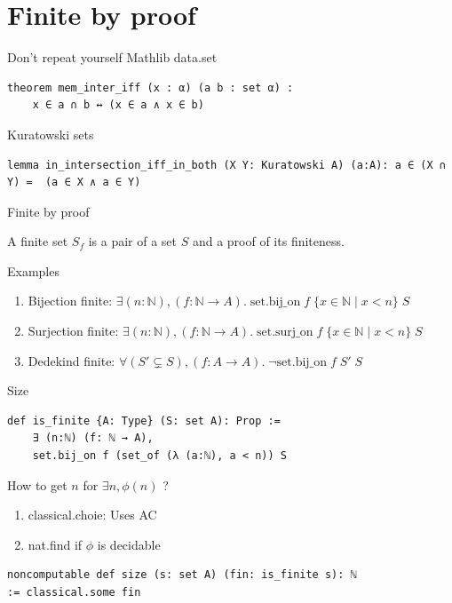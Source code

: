 \documentclass[aspectratio=169]{beamer}
\begin{document}
\section{Finite by proof}
    \begin{frame}[fragile]{Don't repeat yourself}
        Mathlib data.set
        \begin{lstlisting}
theorem mem_inter_iff (x : α) (a b : set α) :
    x ∈ a ∩ b ↔ (x ∈ a ∧ x ∈ b)
        \end{lstlisting}
        Kuratowski sets
        \begin{lstlisting}
lemma in_intersection_iff_in_both (X Y: Kuratowski A) (a:A): a ∈ (X ∩ Y) =  (a ∈ X ∧ a ∈ Y)
        \end{lstlisting}

    \end{frame}
    \begin{frame}{Finite by proof}
        \begin{definition}
            A finite set $S_f$ is a pair of a set $S$ and a proof of its finiteness.
        \end{definition}
        \pause
        Examples
        \begin{enumerate}
            \item Bijection finite: $\exists (n:\mathbb{N}), (f: \mathbb{N} \to A).\; \text{{set.bij\_on}}\; f \;\{ x \in \mathbb{N} \mid x < n\} \;S$
            \item Surjection finite: $\exists (n:\mathbb{N}), (f: \mathbb{N} \to A).\; \text{{set.surj\_on}}\; f \;\{ x \in \mathbb{N} \mid x < n\} \;S $
            \item Dedekind finite: $\forall (S' \subsetneq S), (f: A \to A).\; \neg \text{{set.bij\_on}}\; f\; S'\; S$
        \end{enumerate}
    \end{frame}
    

    \begin{frame}[fragile]{Size}
\begin{lstlisting}
def is_finite {A: Type} (S: set A): Prop := 
    ∃ (n:ℕ) (f: ℕ → A), 
    set.bij_on f (set_of (λ (a:ℕ), a < n)) S
\end{lstlisting}

How to get $n$ for $\exists n, \phi(n)$ ?
\begin{enumerate}
    \item classical.choie: Uses AC
    \item nat.find if $\phi$ is decidable
\end{enumerate}

    \begin{lstlisting}
noncomputable def size (s: set A) (fin: is_finite s): ℕ
:= classical.some fin
\end{lstlisting}
    \end{frame}
\end{document}
